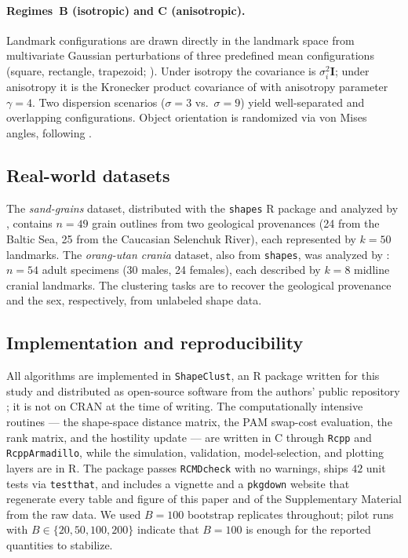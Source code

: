 \documentclass[review,11pt,3p,authoryear]{elsarticle}
\newcommand{\bI}{\mathbf{I}}
\newcommand{\ShapeClust}{\texttt{ShapeClust}}
\begin{document}
\paragraph{Regimes~B (isotropic) and C (anisotropic).}
Landmark configurations are drawn directly in the landmark space from
multivariate Gaussian perturbations of three predefined mean
configurations (square, rectangle, trapezoid; \citealt{amaral2007pivotal}).
Under isotropy the covariance is $\sigma_i^2\bI$; under anisotropy it is
the Kronecker product covariance of \citet{preston2010two} with
anisotropy parameter $\gamma=4$. Two dispersion scenarios
($\sigma=3$ vs.\ $\sigma=9$) yield well-separated and overlapping
configurations. Object orientation is randomized via von Mises angles,
following \citet{vinue2016means}.

\subsection{Real-world datasets}

The \emph{sand-grains} dataset, distributed with the \texttt{shapes} R
package \citep{dryden2012shapes} and analyzed by
\citet{kent2000using}, contains $n=49$ grain outlines from two
geological provenances (24 from the Baltic Sea, 25 from the Caucasian
Selenchuk River), each represented by $k=50$ landmarks. The
\emph{orang-utan crania} dataset, also from \texttt{shapes}, was
analyzed by \citet{o1989morphometric}: $n=54$ adult specimens (30
males, 24 females), each described by $k=8$ midline cranial landmarks.
The clustering tasks are to recover the geological provenance and the
sex, respectively, from unlabeled shape data.

\subsection{Implementation and reproducibility}

All algorithms are implemented in \ShapeClust{}, an R package written for
this study and distributed as open-source software from the authors' public
repository \citep{shapeclustpkg}; it is not on CRAN at the time of writing.
The computationally intensive routines --- the shape-space distance matrix, the
PAM swap-cost evaluation, the rank matrix, and the hostility update --- are
written in C\raisebox{0.3ex}{\scriptsize++} through \texttt{Rcpp} and
\texttt{RcppArmadillo}, while the simulation, validation, model-selection, and
plotting layers are in R. The package passes \texttt{R\;CMD\;check} with no
warnings, ships $42$ unit tests via \texttt{testthat}, and includes a vignette
and a \texttt{pkgdown} website that regenerate every table and figure of this
paper and of the Supplementary Material from the raw data. We used $B=100$
bootstrap replicates throughout; pilot runs with $B\in\{20,50,100,200\}$
indicate that $B=100$ is enough for the reported quantities to stabilize.
\end{document}
